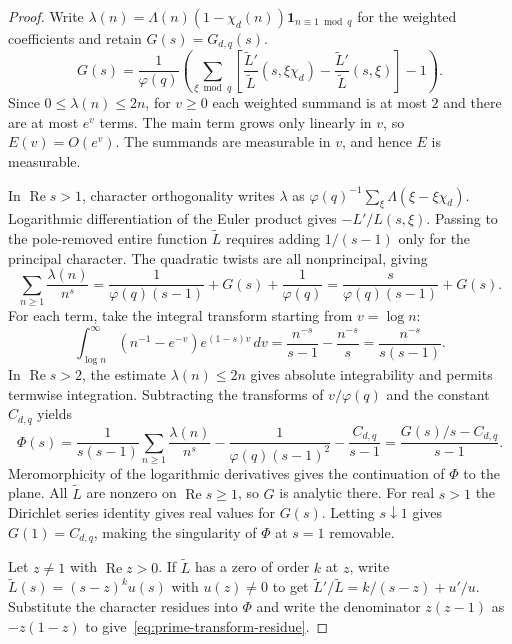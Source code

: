\begin{proof}
Write $\lambda(n)=\Lambda(n)(1-\chi_d(n))\mathbf 1_{n\equiv1\bmod q}$ for the weighted coefficients and retain $G(s)=G_{d,q}(s)$.
\[
 G(s)=\frac1{\varphi(q)}\left(\sum_{\xi\bmod q}
 \left[\frac{\widetilde L'}{\widetilde L}(s,\xi\chi_d)
             -\frac{\widetilde L'}{\widetilde L}(s,\xi)\right]-1\right).
\]
Since $0\le\lambda(n)\le 2n$, for $v\ge0$ each weighted summand is at most $2$ and there are at most $e^v$ terms. The main term grows only linearly in $v$, so $E(v)=O(e^v)$. The summands are measurable in $v$, and hence $E$ is measurable.

In $\operatorname{Re}s>1$, character orthogonality writes $\lambda$ as $\varphi(q)^{-1}\sum_\xi \Lambda(\xi-\xi\chi_d)$. Logarithmic differentiation of the Euler product gives $-L'/L(s,\xi)$. Passing to the pole-removed entire function $\widetilde L$ requires adding $1/(s-1)$ only for the principal character. The quadratic twists are all nonprincipal, giving
\[
 \sum_{n\ge1}\frac{\lambda(n)}{n^s}
 =\frac1{\varphi(q)(s-1)}+G(s)+\frac1{\varphi(q)}
 =\frac{s}{\varphi(q)(s-1)}+G(s).
\]
For each term, take the integral transform starting from $v=\log n$:
\[
 \int_{\log n}^\infty (n^{-1}-e^{-v})e^{(1-s)v}\,dv
 =\frac{n^{-s}}{s-1}-\frac{n^{-s}}s=\frac{n^{-s}}{s(s-1)}.
\]
In $\operatorname{Re}s>2$, the estimate $\lambda(n)\le 2n$ gives absolute integrability and permits termwise integration. Subtracting the transforms of $v/\varphi(q)$ and the constant $C_{d,q}$ yields
\[
 \Phi(s)=\frac{1}{s(s-1)}\sum_{n\ge1}\frac{\lambda(n)}{n^s}
            -\frac{1}{\varphi(q)(s-1)^2}-\frac{C_{d,q}}{s-1}
         =\frac{G(s)/s-C_{d,q}}{s-1}.
\]
Meromorphicity of the logarithmic derivatives gives the continuation of $\Phi$ to the plane. All $\widetilde L$ are nonzero on $\operatorname{Re}s\ge1$, so $G$ is analytic there. For real $s>1$ the Dirichlet series identity gives real values for $G(s)$. Letting $s\downarrow1$ gives $G(1)=C_{d,q}$, making the singularity of $\Phi$ at $s=1$ removable.

Let $z\ne1$ with $\operatorname{Re}z>0$. If $\widetilde L$ has a zero of order $k$ at $z$, write $\widetilde L(s)=(s-z)^k u(s)$ with $u(z)\ne0$ to get $\widetilde L'/\widetilde L=k/(s-z)+u'/u$. Substitute the character residues into $\Phi$ and write the denominator $z(z-1)$ as $-z(1-z)$ to give~\eqref{eq:prime-transform-residue}.
\end{proof}

